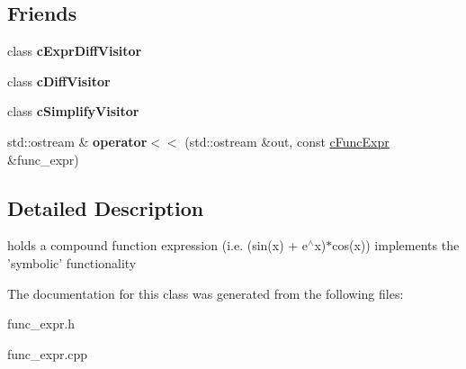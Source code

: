 \subsection*{Friends}
\begin{DoxyCompactItemize}
\item 
\hypertarget{classcFuncExpr_ae37b92d9226a688089d270228c442608}{class {\bfseries c\-Expr\-Diff\-Visitor}}\label{classcFuncExpr_ae37b92d9226a688089d270228c442608}

\item 
\hypertarget{classcFuncExpr_a9fc7bf9f80422eb5d9255b49005b24b6}{class {\bfseries c\-Diff\-Visitor}}\label{classcFuncExpr_a9fc7bf9f80422eb5d9255b49005b24b6}

\item 
\hypertarget{classcFuncExpr_a53892c389b88a764b4b9c5385980f348}{class {\bfseries c\-Simplify\-Visitor}}\label{classcFuncExpr_a53892c389b88a764b4b9c5385980f348}

\item 
\hypertarget{classcFuncExpr_aaa0d90351f14b880688cece98cc467c7}{std\-::ostream \& {\bfseries operator$<$$<$} (std\-::ostream \&out, const \hyperlink{classcFuncExpr}{c\-Func\-Expr} \&func\-\_\-expr)}\label{classcFuncExpr_aaa0d90351f14b880688cece98cc467c7}

\end{DoxyCompactItemize}


\subsection{Detailed Description}
holds a compound function expression (i.\-e. (sin(x) + e$^\wedge$x)$\ast$cos(x)) implements the 'symbolic' functionality 

The documentation for this class was generated from the following files\-:\begin{DoxyCompactItemize}
\item 
func\-\_\-expr.\-h\item 
func\-\_\-expr.\-cpp\end{DoxyCompactItemize}
